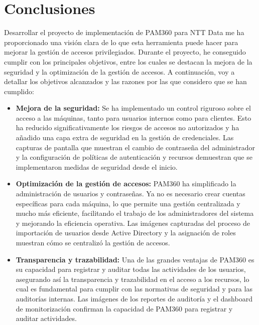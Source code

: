 
\section{Conclusiones}

Desarrollar el proyecto de implementación de PAM360 para NTT Data me ha proporcionado una visión clara de lo que esta herramienta puede hacer para mejorar la gestión de accesos privilegiados. Durante el proyecto, he conseguido cumplir con los principales objetivos, entre los cuales se destacan la mejora de la seguridad y la optimización de la gestión de accesos. A continuación, voy a detallar los objetivos alcanzados y las razones por las que considero que se han cumplido:

\begin{itemize}
	\item \textbf{Mejora de la seguridad:} Se ha implementado un control riguroso sobre el acceso a las máquinas, tanto para usuarios internos como para clientes. Esto ha reducido significativamente los riesgos de accesos no autorizados y ha añadido una capa extra de seguridad en la gestión de credenciales. Las capturas de pantalla que muestran el cambio de contraseña del administrador y la configuración de políticas de autenticación y recursos demuestran que se implementaron medidas de seguridad desde el inicio.
	
	\item \textbf{Optimización de la gestión de accesos:} PAM360 ha simplificado la administración de usuarios y contraseñas. Ya no es necesario crear cuentas específicas para cada máquina, lo que permite una gestión centralizada y mucho más eficiente, facilitando el trabajo de los administradores del sistema y mejorando la eficiencia operativa. Las imágenes capturadas del proceso de importación de usuarios desde Active Directory y la asignación de roles muestran cómo se centralizó la gestión de accesos.

	
	\item \textbf{Transparencia y trazabilidad:} Una de las grandes ventajas de PAM360 es su capacidad para registrar y auditar todas las actividades de los usuarios, asegurando así la transparencia y trazabilidad en el
	acceso a los recursos, lo cual es fundamental para cumplir con las normativas de seguridad y para las auditorías internas. Las imágenes de los reportes de auditoría y el dashboard de monitorización confirman la capacidad de PAM360 para registrar y auditar actividades.
	

\end{itemize}
